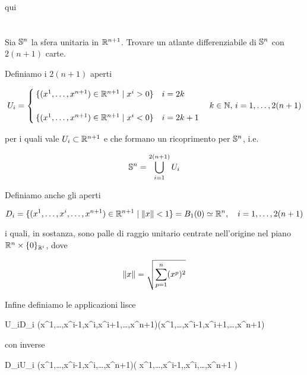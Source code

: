 qui

\tocless\section{}\label{es2-1}

\begin{tcolorbox}
	Sia $ \S^{n} $ la sfera unitaria in $ \R^{n+1} $. Trovare un atlante differenziabile di $ \S^{n} $ con $ 2(n+1) $ carte.

\end{tcolorbox}

Definiamo i $ 2(n+1) $ aperti

\begin{equation}
	U_{i} = %
	\begin{cases}
		\{ (x^{1},\dots,x^{n+1}) \in \R^{n+1} \mid x^{i} > 0 \} & i = 2k\\\\
		\{ (x^{1},\dots,x^{n+1}) \in \R^{n+1} \mid x^{i} < 0 \} & i = 2k+1
	\end{cases}%
	\quad k \in \N, \, i = 1,\dots,2(n+1)
\end{equation}

per i quali vale $ U_{i} \subset \R^{n+1} $ e che formano un ricoprimento per $ \S^{n} $, i.e.

\begin{equation}
	\S^{n} = \bigcup_{i=1}^{2(n+1)} U_{i}
\end{equation}

Definiamo anche gli aperti

\begin{equation}
	D_{i} = \{ (x^{1},\dots,x^{i},\dots,x^{n+1}) \in \R^{n+1} \mid \norm{x} < 1 \} = B_{1}(0) \simeq \R^{n} \qcomma i = 1,\dots,2(n+1)
\end{equation}

i quali, in sostanza, sono palle di raggio unitario centrate nell'origine nel piano $ \R^{n} \times \{0\}_{\R^{i}} $, dove

\begin{equation}
	\norm{x} = \sqrt{ \sum_{p=1}^{n} (x^{p})^{2} }
\end{equation}

Infine definiamo le applicazioni lisce

%
	{U_{i}}{D_{i}}%
	{(x^{1},\dots,x^{i-1},x^{i},x^{i+1},\dots,x^{n+1})}{(x^{1},\dots,x^{i-1},x^{i+1},\dots,x^{n+1})}

con inverse

%
	{D_{i}}{U_{i}}%
	{(x^{1},\dots,x^{i-1},x^{i},\dots,x^{n+1})}{\left( x^{1},\dots,x^{i-1},,x^{i},\dots,x^{n+1} \right)}

